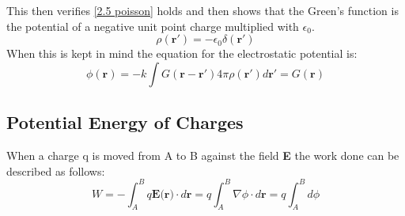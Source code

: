 \noindent This then verifies \ref{2.5 poisson} holds and then shows that the Green's function is the potential of a negative unit point charge multiplied with $\epsilon_0$.
\begin{equation}
    \rho(\textbf{r}') = -\epsilon_0 \delta(\textbf{r}')
\end{equation}
When this is kept in mind the equation for the electrostatic potential is:
\begin{equation}
    \phi(\textbf{r})= -k \int G(\textbf{r}-\textbf{r}')4 \pi \rho(\textbf{r}') d \textbf{r}' = G(\textbf{r})
\end{equation}
\subsection{Potential Energy of Charges}
When a charge q is moved from A to B against the field \textbf{E} the work done can be described as follows:
\begin{equation}
    W = - \int_A^B q\textbf{E(r)} \cdot d\textbf{r} = q\int_A^B \nabla\phi \cdot d\textbf{r} =  q\int_A^B d\phi 
\end{equation}